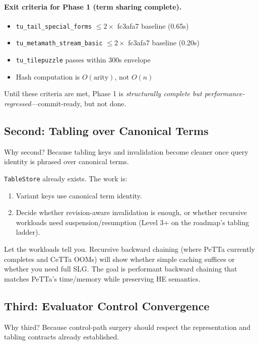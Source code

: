 \documentclass[11pt]{article}
\newcommand{\code}[1]{\texttt{#1}}
\newcommand{\CeTTa}{\textup{CeTTa}}
\newcommand{\HE}{\textup{HE}}
\newcommand{\PeTTa}{\textup{PeTTa}}
\begin{document}
\paragraph{Exit criteria for Phase 1 (term sharing complete).}
\begin{itemize}
\item \code{tu\_tail\_special\_forms} $\leq 2\times$ fc3afa7 baseline (0.65s)
\item \code{tu\_metamath\_stream\_basic} $\leq 2\times$ fc3afa7 baseline (0.20s)
\item \code{tu\_tilepuzzle} passes within 300s envelope
\item Hash computation is $O(\mathrm{arity})$, not $O(n)$
\end{itemize}

Until these criteria are met, Phase 1 is \emph{structurally complete but
performance-regressed}---commit-ready, but not done.

\subsection{Second: Tabling over Canonical Terms}

Why second?  Because tabling keys and invalidation become cleaner once
query identity is phrased over canonical terms.

\code{TableStore} already exists.  The work is:
\begin{enumerate}
\item Variant keys use canonical term identity.
\item Decide whether revision-aware invalidation is enough, or whether
  recursive workloads need suspension/resumption (Level 3+ on the
  roadmap's tabling ladder).
\end{enumerate}

Let the workloads tell you.  Recursive backward chaining (where \PeTTa{}
currently completes and \CeTTa{} OOMs) will show whether simple caching
suffices or whether you need full SLG.  The goal is performant backward
chaining that matches \PeTTa{}'s time/memory while preserving \HE{} semantics.

\subsection{Third: Evaluator Control Convergence}

Why third?  Because control-path surgery should respect the representation
and tabling contracts already established.
\end{document}
